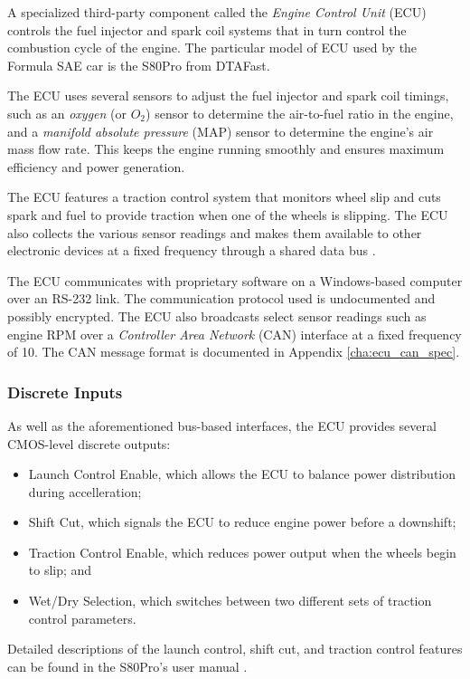 A specialized third-party component called the \emph{Engine Control Unit} (ECU) controls the fuel injector and spark coil systems that in turn control the combustion cycle of the engine. The particular model of ECU used by the Formula SAE car is the S80Pro from DTAFast.

The ECU uses several sensors to adjust the fuel injector and spark coil timings, such as an \emph{oxygen} (or \emph{$O_{2}$}) sensor to determine the air-to-fuel ratio in the engine, and a \emph{manifold absolute pressure} (MAP) sensor to determine the engine's air mass flow rate. This keeps the engine running smoothly and ensures maximum efficiency and power generation. 

The ECU features a traction control system that monitors wheel slip and cuts spark and fuel to provide traction when one of the wheels is slipping. The ECU also collects the various sensor readings and makes them available to other electronic devices at a fixed frequency through a shared data bus \cite{s80pro}.


The ECU communicates with proprietary software on a Windows-based computer over an RS-232 link. The communication protocol used is undocumented and possibly encrypted. The ECU also broadcasts select sensor readings such as engine RPM over a \emph{Controller Area Network} (CAN) interface at a fixed frequency of \unit{10}{\hertz}. The CAN message format is documented in Appendix \ref{cha:ecu_can_spec}.

\subsubsection{Discrete Inputs\label{sec:ecu_background_discrete_inputs}}

As well as the aforementioned bus-based interfaces, the ECU provides several CMOS-level discrete outputs:

\begin{itemize}
    \item Launch Control Enable, which allows the ECU to balance power distribution during accelleration;
    \item Shift Cut, which signals the ECU to reduce engine power before a downshift;
    \item Traction Control Enable, which reduces power output when the wheels begin to slip; and
    \item Wet/Dry Selection, which switches between two different sets of traction control parameters.
\end{itemize}

Detailed descriptions of the launch control, shift cut, and traction control features can be found in the S80Pro's user manual \cite{s80pro}.


